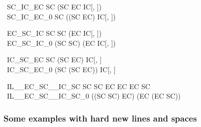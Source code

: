 \documentclass{article}
\begin{document}
\begin{circus}
    \circprocess\ SC\_IC\_EC   \circdef SC \circseq (SC \extchoice EC \intchoice IC[\nat, \nat]) \\
    \circprocess\ SC\_IC\_EC_0 \circdef SC \circseq ((SC \extchoice EC) \intchoice IC[\nat, \nat])
\end{circus}

\begin{circus}
    \circprocess\ EC\_SC\_IC   \circdef SC \circseq SC \extchoice (EC \intchoice IC[\nat, \nat]) \\
    \circprocess\ EC\_SC\_IC_0 \circdef (SC \circseq SC) \extchoice (EC \intchoice IC[\nat, \nat])
\end{circus}

\begin{circus}
    \circprocess\ IC\_SC\_EC   \circdef SC \circseq (SC \extchoice EC) \intchoice IC[\nat, \nat] \\
    \circprocess\ IC\_SC\_EC_0 \circdef (SC \circseq (SC \extchoice EC)) \intchoice IC[\nat, \nat]
\end{circus}

\begin{circus}
    \circprocess\ IL\_\_EC\_SC\_\_IC\_SC   \circdef SC \circseq SC \extchoice EC \interleave EC \intchoice EC \circseq SC \\
    \circprocess\ IL\_\_EC\_SC\_\_IC\_SC_0 \circdef ((SC \circseq SC) \extchoice EC) \interleave (EC \intchoice (EC \circseq SC))
\end{circus}

\subsubsection{Some examples with hard new lines and spaces}
\end{document}
